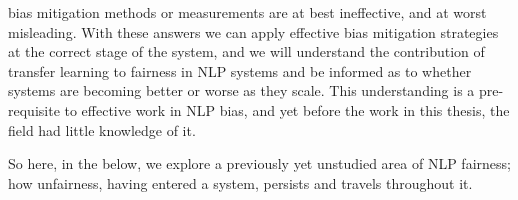 bias mitigation methods or measurements are at best ineffective, and at worst misleading. With these answers we can apply effective bias mitigation strategies at the correct stage of the system, and we will understand the contribution of transfer learning to fairness in NLP systems and be informed as to whether systems are becoming better or worse as they scale. This understanding is a pre-requisite to effective work in NLP bias, and yet before the work in this thesis, the field had little knowledge of it.

So here, in the below, we explore a previously yet unstudied area of NLP fairness; how unfairness, having entered a system, persists and travels throughout it. 

